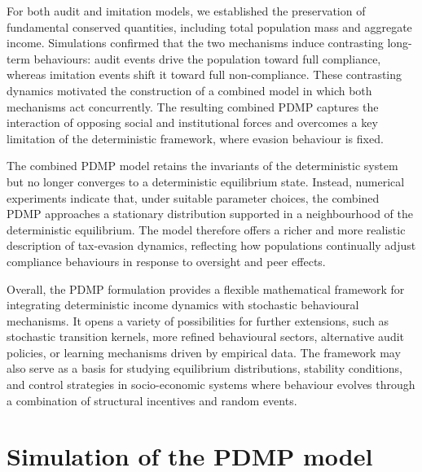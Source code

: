 \documentclass[11pt]{article}
\theoremstyle{plain}
\theoremstyle{definition}
\newcommand{\1}{\mathbf{1}}
\begin{document}
For both audit and imitation models, we established the preservation of fundamental conserved quantities, including total population mass and aggregate income. Simulations confirmed that the two mechanisms induce contrasting long-term behaviours: audit events drive the population toward full compliance, whereas imitation events shift it toward full non-compliance. These contrasting dynamics motivated the construction of a combined model in which both mechanisms act concurrently. The resulting combined PDMP captures the interaction of opposing social and institutional forces and overcomes a key limitation of the deterministic framework, where evasion behaviour is fixed.

The combined PDMP model retains the invariants of the deterministic system but no longer converges to a deterministic equilibrium state. Instead, %
numerical experiments indicate that, under suitable parameter choices, the combined PDMP approaches a stationary distribution supported in a neighbourhood of the deterministic equilibrium. The model therefore offers a richer and more realistic description of tax-evasion dynamics, reflecting how populations continually adjust compliance behaviours in response to oversight and peer effects.

Overall, the PDMP formulation provides a flexible mathematical framework for integrating deterministic income dynamics with stochastic behavioural mechanisms. It opens a variety of possibilities for further extensions, such as stochastic transition kernels, more refined behavioural sectors, alternative audit policies, or learning mechanisms driven by empirical data. The framework may also serve as a basis for studying equilibrium distributions, stability conditions, and control strategies in socio-economic systems where behaviour evolves through a combination of structural incentives and random events.


\appendix
\renewcommand{\appendixpagename}{Appendix}
\appendixpage


\section{Simulation of the PDMP model}
\label{PDMP_simulation}
\end{document}
